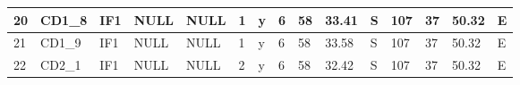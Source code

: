 {\begin{table}[]
\begin{tabular}{|l|l|l|l|l|l|l|l|l|l|l|l|l|l|l|}
		20                                & CD1\_8                                    & IF1                                       & NULL                            & NULL                            & 1                               & y                                    & 6                                                                                    & 58                                                                                   & 33.41                                                                                & S                                                                                 & 107                                                                                   & 37                                                                                    & 50.32                                                                                 & E                                                                                  \\ \hline
		21                                & CD1\_9                                    & IF1                                       & NULL                            & NULL                            & 1                               & y                                    & 6                                                                                    & 58                                                                                   & 33.58                                                                                & S                                                                                 & 107                                                                                   & 37                                                                                    & 50.32                                                                                 & E                                                                                  \\ \hline
		22                                & CD2\_1                                    & IF1                                       & NULL                            & NULL                            & 2                               & y                                    & 6                                                                                    & 58                                                                                   & 32.42                                                                                & S                                                                                 & 107                                                                                   & 37                                                                                    & 50.32                                                                                 & E                                                                                  \\ \hline

\end{tabular}
\end{table}}
